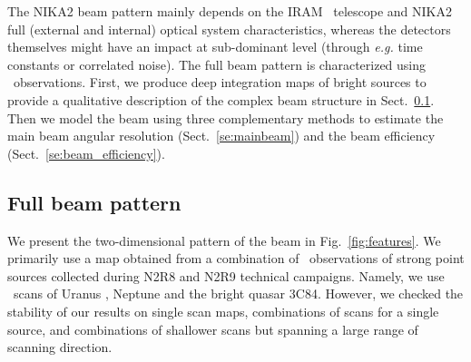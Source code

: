 
The NIKA2 beam pattern mainly depends on the IRAM \trentemetre\ telescope and
NIKA2 full (external and internal) optical system characteristics,
whereas the detectors themselves might have an impact at sub-dominant
level (through \emph{e.g.} time constants or correlated noise).
The full beam pattern is characterized using \bm\ observations. First,
we produce deep integration maps of bright sources to provide a
qualitative description of the complex beam structure in
Sect.~\ref{se:fullbeam}. Then we model the beam using three
complementary methods to estimate the main beam angular resolution
(Sect.~\ref{se:mainbeam}) and the beam efficiency
(Sect.~\ref{se:beam_efficiency}).

\subsection{Full beam pattern}
\label{se:fullbeam}

We present the two-dimensional pattern of the beam in
Fig.~\ref{fig:features}. We primarily use a map obtained from a combination
of \bm\ observations of strong point sources collected during
N2R8 and N2R9 technical campaigns. Namely, we use \bm\ scans
of Uranus%
,  Neptune %
and the bright quasar 3C84. %
However, we checked the stability of our results on single scan maps,
combinations of scans for a single source, and combinations of
shallower scans but spanning a large range of scanning direction.


